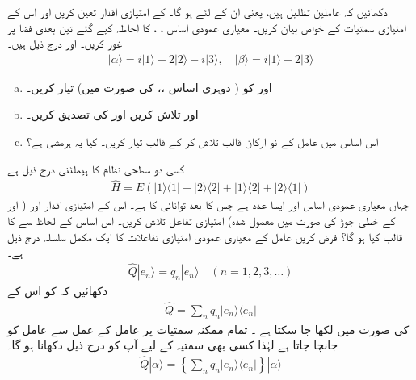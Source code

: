  
دکھائیں کہ عاملین تظلیل  ہیں، یعنی  ان کے لئے ہو گا۔  کے امتیازی اقدار تعین کریں اور اس کے امتیازی سمتیات کے خواص  بیان کریں۔
  معیاری عمودی اساس ،  ،  کا احاطہ کیے گئے  تین  بعدی فضا پر غور کریں۔  اور  درج ذیل ہیں۔ 
\begin{align*}
| \alpha \rangle = i | 1 \rangle -2|2\rangle -i|3\rangle , \quad | \beta \rangle = i|1\rangle +2|3\rangle 
\end{align*}
\begin{enumerate}[a.]
\item
   اور     کو ( دوہری اساس  ،،  کی صورت میں)  تیار کریں۔ 
\item
   اور  تلاش کریں اور     کی تصدیق کریں۔
\item
 اس  اساس میں عامل   کے نو ارکان قالب  تلاش کر کے قالب  تیار کریں۔  کیا یہ  ہرمشی ہے؟
\end{enumerate} 
کسی دو سطحی نظام کا ہیملٹنی درج ذیل ہے 
\begin{align*}
\hat{H} = E( | 1 \rangle \langle 1 | - |2\rangle \langle 2 | + | 1 \rangle \langle 2 | + | 2 \rangle \langle 1 | )
\end{align*}
جہاں  معیاری عمودی اساس   اور   ایسا  عدد ہے جس کا بعد  توانائی کا ہے۔ اس کے امتیازی اقدار اور (  اور  کے خطی جوڑ کی صورت میں  معمول شدہ)  امتیازی تفاعل تلاش کریں۔ اس اساس کے لحاظ سے  کا قالب   کیا ہو گا؟ 
 فرض کریں  عامل   کے معیاری عمودی امتیازی تفاعلات  کا ایک مکمل سلسلہ  درج ذیل ہے۔ 
\begin{align*}
\hat{Q}|e_{n} \rangle = q_{n} | e_{n} \rangle \quad (n = 1,2,3,\dotsc )
\end{align*}
دکھائیں کہ  کو اس کے
\begin{align*}
\hat{Q} = \sum_{n} q_{n} | e_{n} \rangle \langle e_{n} |
\end{align*}
 کی صورت میں لکھا جا سکتا ہے ۔  \quad 
  تمام ممکنہ سمتیات پر  عامل کے عمل سے  عامل کو جانچا جاتا ہے لہٰذا کسی بھی سمتیہ  کے لیے آپ کو درج ذیل دکھانا ہو گا۔ 
\begin{align*}
\hat{Q} | \alpha \rangle = \left\{ \sum_{n} q_{n} | e_{n} \rangle \langle e_{n} | \right\} | \alpha \rangle 
\end{align*}


